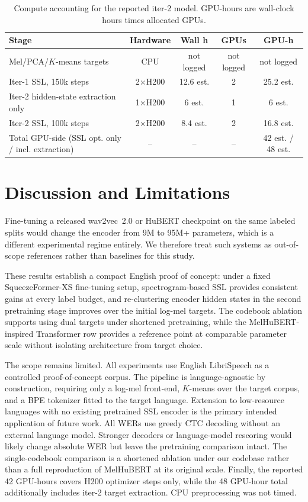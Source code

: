 \documentclass{article}
\begin{document}
\begin{table}[t]
  \caption{Compute accounting for the reported iter-2 model. GPU-hours are
    wall-clock hours times allocated GPUs.}
  \label{tab:compute}
  \centering
  \tiny
  \setlength{\tabcolsep}{1.4pt}
  \renewcommand{\arraystretch}{0.98}
  \begin{tabular}{@{}p{}cccc@{}}
    \toprule
    Stage & Hardware & Wall h & GPUs & GPU-h \\
    \midrule
    Mel/PCA/$K$-means targets & CPU & not logged & not logged & not logged \\
    Iter-1 SSL, 150k steps & 2$\times$H200 & 12.6 est. & 2 & 25.2 est. \\
    Iter-2 hidden-state extraction only & 1$\times$H200 & 6 est. & 1 & 6 est. \\
    Iter-2 SSL, 100k steps & 2$\times$H200 & 8.4 est. & 2 & 16.8 est. \\
    \midrule
    Total GPU-side (SSL opt. only / incl. extraction) & -- & -- & -- & 42 est. / 48 est. \\
    \bottomrule
  \end{tabular}
\end{table}

\section{Discussion and Limitations}
\label{sec:discussion}

Fine-tuning a released wav2vec~2.0 or HuBERT checkpoint on the same
labeled splits would change the encoder from 9M to 95M+ parameters,
which is a different experimental regime entirely. We therefore treat
such systems as out-of-scope references rather than baselines for
this study.

These results establish a compact English proof of concept: under a
fixed SqueezeFormer-XS fine-tuning setup, spectrogram-based SSL
provides consistent gains at every label budget, and re-clustering
encoder hidden states in the second pretraining stage improves over
the initial log-mel targets. The codebook ablation supports using
dual targets under shortened pretraining, while the MelHuBERT-inspired
Transformer row provides a reference point at comparable parameter
scale without isolating architecture from target choice.

The scope remains limited. All experiments use English LibriSpeech as
a controlled proof-of-concept corpus. The pipeline is language-agnostic
by construction, requiring only a log-mel front-end, $K$-means over the
target corpus, and a BPE tokenizer fitted to the target language.
Extension to low-resource languages with no existing pretrained SSL
encoder is the primary intended application of future work. All WERs
use greedy CTC decoding without an external language model. Stronger
decoders or language-model rescoring would likely change absolute WER
but leave the pretraining comparison intact. The single-codebook
comparison is a shortened ablation under our codebase rather than a
full reproduction of MelHuBERT at its original scale. Finally, the reported 42 GPU-hours covers H200 optimizer steps
only, while the 48 GPU-hour total additionally includes iter-2
target extraction. CPU preprocessing was not timed.
\end{document}

